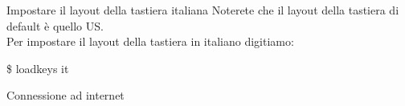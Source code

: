 \begin{frame}{Impostare il layout della tastiera italiana}
    Noterete che il layout della tastiera di default è quello US.\\
    Per impostare il layout della tastiera in italiano digitiamo:
    \begin{block}{}
        \$ loadkeys it
    \end{block}
\end{frame}

\begin{frame}{Connessione ad internet}
    
\end{frame}